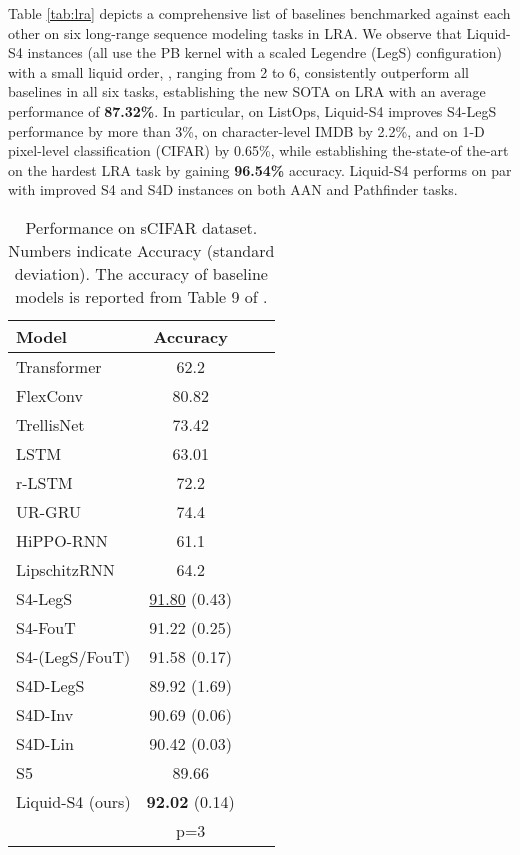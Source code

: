 \documentclass{MITcsail}
\begin{document}
Table \ref{tab:lra} depicts a comprehensive list of baselines benchmarked against each other on six long-range sequence modeling tasks in LRA. We observe that Liquid-S4 instances (all use the PB kernel with a scaled Legendre (LegS) configuration) with a small liquid order, , ranging from 2 to 6, consistently outperform all baselines in all six tasks, establishing the new SOTA on LRA with an average performance of \textbf{87.32\%}. In particular, on ListOps, Liquid-S4 improves S4-LegS performance by more than 3\%, on character-level IMDB by 2.2\%, and on 1-D pixel-level classification (CIFAR) by 0.65\%, while establishing the-state-of the-art on the hardest LRA task by gaining \textbf{96.54\%} accuracy. Liquid-S4 performs on par with improved S4 and S4D instances on both AAN and Pathfinder tasks. 

\begin{table}[t]
    \centering
    \caption{Performance on sCIFAR dataset. Numbers indicate Accuracy (standard deviation). The accuracy of baseline models is reported from Table 9 of \citet{gu2022parameterization}.}
    \begin{adjustbox}{width=0.45\textwidth}
    \begin{tabular}{lccc}
\toprule
Model & Accuracy \\
\midrule
Transformer \citep{trinh2018learning} & 62.2 \\
FlexConv \citep{romero2021flexconv} & 80.82 \\
TrellisNet \citep{bai2018trellis} & 73.42 \\
LSTM \citep{hochreiter1997long} & 63.01 \\
r-LSTM \citep{trinh2018learning} & 72.2 \\
UR-GRU \citep{gu2020improving} & 74.4 \\
HiPPO-RNN \citep{gu2020hippo} & 61.1 \\
LipschitzRNN \citep{erichson2021lipschitz} & 64.2 \\
\midrule
S4-LegS \citep{gu2022parameterization} & \underline{91.80} (0.43) \\
S4-FouT \citep{gu2022parameterization} & 91.22 (0.25) \\
S4-(LegS/FouT) \citep{gu2022parameterization} & 91.58 (0.17) \\
\midrule
S4D-LegS \citep{gu2022parameterization} & 89.92 (1.69) \\
S4D-Inv \citep{gu2022parameterization} & 90.69 (0.06) \\
S4D-Lin \citep{gu2022parameterization} & 90.42 (0.03) \\
S5 \cite{smith2022simplified} &  89.66 \\
\midrule
Liquid-S4 (ours) & \textbf{92.02} (0.14) \\
& p=3\\
\bottomrule
    \end{tabular}
    \end{adjustbox}
    \label{tab:scifar}
\end{table}
\end{document}
